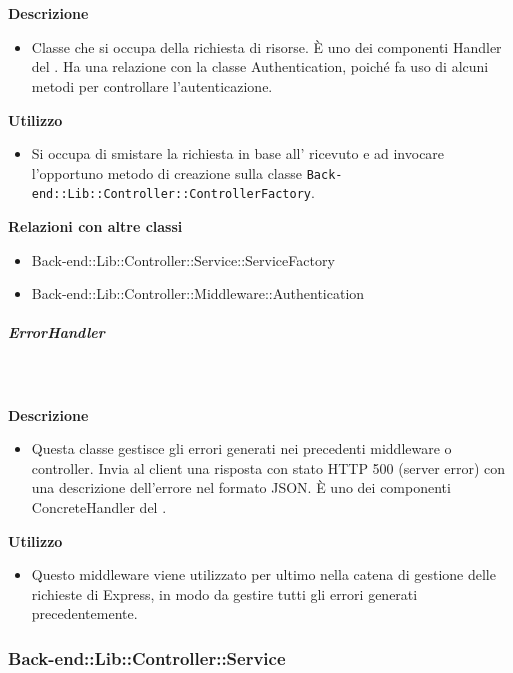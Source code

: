 				\textbf{\\ \\ Descrizione} 
					\begin{itemize}
						\item[] Classe che si occupa della richiesta di risorse. È uno dei componenti Handler del  . Ha una relazione con la classe Authentication, poiché fa uso di alcuni metodi per controllare l'autenticazione.
					\end{itemize}      
				\textbf{Utilizzo}  
					\begin{itemize}
						\item[] Si occupa di smistare la richiesta in base all' ricevuto e ad invocare l'opportuno metodo di creazione sulla classe \texttt{Back-end::Lib::Controller::ControllerFactory}.
					\end{itemize}
					\textbf{Relazioni con altre classi}
					\begin{itemize}
							\item{Back-end::Lib::Controller::Service::ServiceFactory}
							\item{Back-end::Lib::Controller::Middleware::Authentication}
					\end{itemize}
			\subparagraph{ErrorHandler}
				
				\textbf{\\ \\ Descrizione} 
					\begin{itemize}
						\item[] Questa classe gestisce gli errori generati nei precedenti middleware o controller. Invia al client una risposta con stato HTTP 500 (server error) con una descrizione dell'errore nel formato JSON.
È uno dei componenti ConcreteHandler del  .
					\end{itemize}      
				\textbf{Utilizzo}  
					\begin{itemize}
						\item[] Questo middleware viene utilizzato per ultimo nella catena di gestione delle richieste di Express, in modo da gestire tutti gli errori generati precedentemente.
					\end{itemize}
	\subsubsection{Back-end::Lib::Controller::Service}
